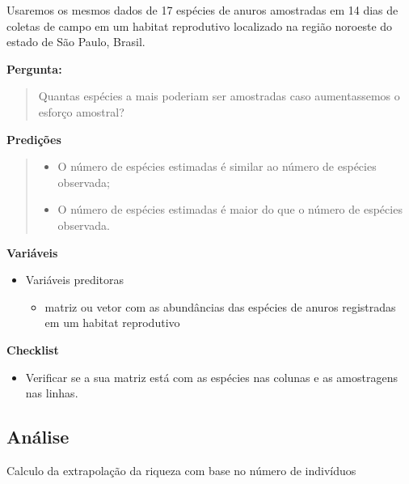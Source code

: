 \documentclass[
]{book}
\providecommand{\tightlist}{%
  \setlength{\itemsep}{0pt}\setlength{\parskip}{0pt}}
\begin{document}
Usaremos os mesmos dados de 17 espécies de anuros amostradas em 14 dias de coletas de campo em um habitat reprodutivo localizado na região noroeste do estado de São Paulo, Brasil.

\textbf{Pergunta:}

\begin{quote}
Quantas espécies a mais poderiam ser amostradas caso aumentassemos o esforço amostral?
\end{quote}

\textbf{Predições}

\begin{quote}
\begin{itemize}
\tightlist
\item
  O número de espécies estimadas é similar ao número de espécies observada;
\item
  O número de espécies estimadas é maior do que o número de espécies observada.
\end{itemize}
\end{quote}

\textbf{Variáveis}

\begin{itemize}
\tightlist
\item
  Variáveis preditoras

  \begin{itemize}
  \tightlist
  \item
    matriz ou vetor com as abundâncias das espécies de anuros registradas em um habitat reprodutivo
  \end{itemize}
\end{itemize}

\textbf{Checklist}

\begin{itemize}
\tightlist
\item
  Verificar se a sua matriz está com as espécies nas colunas e as amostragens nas linhas.
\end{itemize}

\hypertarget{anuxe1lise-6}{%
\subsection{Análise}\label{anuxe1lise-6}}

Calculo da extrapolação da riqueza com base no número de indivíduos
\end{document}
